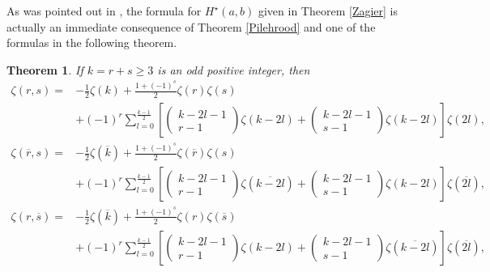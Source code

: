 \documentclass[reqno]{amsart}
\newtheorem{theorem}{Theorem}[section]
\theoremstyle{definition}
\theoremstyle{remark}
\numberwithin{equation}{section}
\begin{document}
 As was pointed out in \cite{16}, the formula for $H^{\star}(a, b)$ given in Theorem \ref{Zagier} is actually an immediate consequence of Theorem \ref{Pilehrood} and one of the formulas in the following theorem.
\begin{theorem}
\label{doubleEuler} If $k=r+s\geq 3$ is an odd positive integer, then
\begin{equation}\label{eq11}\begin{split}
\zeta(r, s)
=&-\frac{1}{2}\zeta(k)
+\frac{1+(-1)^s}{2}\zeta(r)\zeta(s)\\&
+(-1)^r\sum_{l=0}^{\frac{k-1}{2}}\left[\begin{pmatrix}k-2l-1\\r-1\end{pmatrix}\zeta(k-2l)
+  \begin{pmatrix}k-2l-1\\s-1\end{pmatrix}\zeta(k-2l)\right]\zeta(2l),
\end{split}\end{equation}
\begin{equation}\label{eq12}\begin{split}
\zeta(\overline{r}, s)
=&-\frac{1}{2}\zeta(\overline{k})
+\frac{1+(-1)^s}{2}\zeta(\overline{r})\zeta(s)
\\&+(-1)^r\sum_{l=0}^{\frac{k-1}{2}}\left[\begin{pmatrix}k-2l-1\\r-1\end{pmatrix}\zeta(\overline{k-2l})
+ \begin{pmatrix}k-2l-1\\s-1\end{pmatrix}\zeta(k-2l)\right]\zeta(\overline{2l}),
\end{split}\end{equation}
\begin{equation}\label{eq13}\begin{split}
\zeta(r, \overline{s})=&-\frac{1}{2} \zeta(\overline{k})+\frac{1+(-1)^s}{2}\zeta(r)\zeta(\overline{s})
\\&+(-1)^r\sum_{l=0}^{\frac{k-1}{2}}\left[ \begin{pmatrix}k-2l-1\\r-1\end{pmatrix}\zeta(k-2l) + \begin{pmatrix}k-2l-1\\s-1\end{pmatrix}\zeta(\overline{k-2l})\right]\zeta(\overline{2l}),
\end{split}\end{equation}

\end{theorem}
\end{document}

